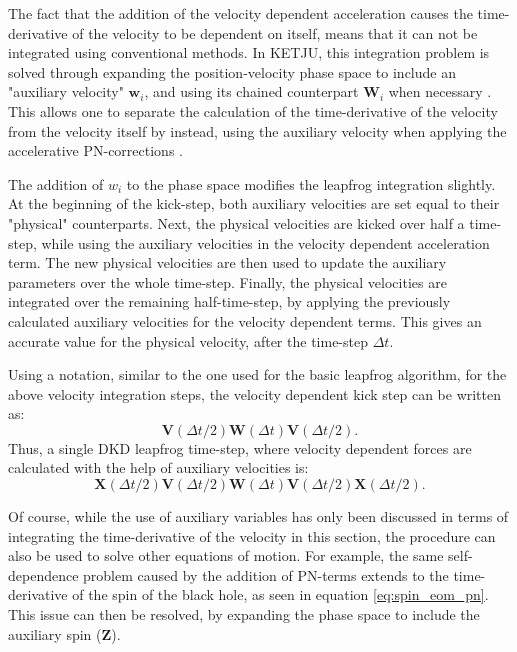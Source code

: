 \documentclass[english, twoside]{HYgradu}
\begin{document}
The fact that the addition of the velocity dependent acceleration causes the time-derivative of the velocity to be dependent on itself, means that it can not be integrated using conventional methods. In KETJU, this integration problem is solved through expanding the position-velocity phase space to include an "auxiliary velocity" $\mathbf{w}_i$, and using its chained counterpart $\mathbf{W}_i$ when necessary \citep{Rantala2017KETJU}. This allows one to separate the calculation of the time-derivative of the velocity from the velocity itself by instead, using the auxiliary velocity when applying the accelerative PN-corrections \citep{Hellstrom2010, Pihajoki2015}.

The addition of $w_i$ to the phase space modifies the leapfrog integration slightly. At the beginning of the kick-step, both auxiliary velocities are set equal to their "physical" counterparts. Next, the physical velocities are kicked over half a time-step, while using the auxiliary velocities in the velocity dependent acceleration term. The new physical velocities are then used to update the auxiliary parameters over the whole time-step. Finally, the physical velocities are integrated over the remaining half-time-step, by applying the previously calculated auxiliary velocities for the velocity dependent terms. This gives an accurate value for the physical velocity, after the time-step $\Delta t$.

Using a notation, similar to the one used for the basic leapfrog algorithm, for the above velocity integration steps, the velocity dependent kick step can be written as:
\begin{equation}
\mathbf{V}(\Delta t/2) \mathbf{W}(\Delta t) \mathbf{V}(\Delta t/2).
\end{equation}
Thus, a single DKD leapfrog time-step, where velocity dependent forces are calculated with the help of auxiliary velocities is:
\begin{equation}
\mathbf{X}(\Delta t/2) \mathbf{V}(\Delta t/2) \mathbf{W}(\Delta t) \mathbf{V}(\Delta t/2) \mathbf{X}(\Delta t/2).
\end{equation}

Of course, while the use of auxiliary variables has only been discussed in terms of integrating the time-derivative of the velocity in this section, the procedure can also be used to solve other equations of motion. For example, the same self-dependence problem caused by the addition of PN-terms extends to the time-derivative of the spin of the black hole, as seen in equation \ref{eq:spin_eom_pn}. This issue can then be resolved, by expanding the phase space to include the auxiliary spin ($\mathbf{Z}$).
\end{document}
